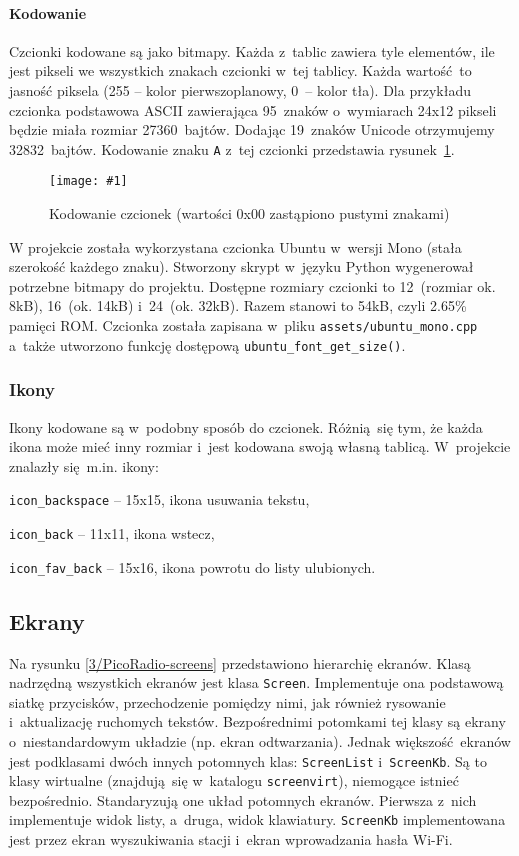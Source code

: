 \documentclass[polish]{aghengthesis}
\let\tempone\itemize
\let\temptwo\enditemize
\renewenvironment{itemize}{\tempone\setlength{\itemsep}{0cm}}{\temptwo}
\newcommand{\imgint}[4]{
	\begin{figure}[{#4}]
		\centering
		\texttt{[image: \#1]}
		\caption{#2}
		\label{#1}
	\end{figure}
}
\newcommand{\imgh}[3]{\imgint{#1}{#2}{#3}{H}}
\begin{document}
				\paragraph{Kodowanie}
					Czcionki kodowane są jako bitmapy. Każda z~tablic zawiera tyle elementów, ile jest pikseli we wszystkich znakach czcionki w~tej tablicy. Każda wartość to jasność piksela (255 -- kolor pierwszoplanowy, 0~-- kolor tła). Dla przykładu czcionka podstawowa ASCII zawierająca 95~znaków o~wymiarach 24x12 pikseli będzie miała rozmiar 27360~bajtów. Dodając 19~znaków Unicode otrzymujemy 32832~bajtów. Kodowanie znaku \lstinline|A| z~tej czcionki przedstawia rysunek~\ref{3/PicoRadio-screen-font}.
				
				\imgh{3/PicoRadio-screen-font}{Kodowanie czcionek (wartości 0x00 zastąpiono pustymi znakami)}{0.6}
				
				W projekcie została wykorzystana czcionka Ubuntu\textsuperscript{\cite{ubuntu_font}} w~wersji Mono (stała szerokość każdego znaku). Stworzony skrypt w~języku Python wygenerował potrzebne bitmapy do projektu. Dostępne rozmiary czcionki to 12~(rozmiar ok. 8kB), 16~(ok. 14kB) i~24~(ok. 32kB). Razem stanowi to 54kB, czyli 2.65\% pamięci ROM. Czcionka została zapisana w~pliku \lstinline|assets/ubuntu_mono.cpp| a~także utworzono funkcję dostępową \lstinline|ubuntu_font_get_size()|. 
				
			\subsubsection{Ikony}
				Ikony kodowane są w~podobny sposób do czcionek. Różnią się tym, że każda ikona może mieć inny rozmiar i~jest kodowana swoją własną tablicą. W~projekcie znalazły się m.in. ikony:
				\begin{itemize}
					\item \lstinline|icon_backspace| -- 15x15, ikona usuwania tekstu,
					\item \lstinline|icon_back| -- 11x11, ikona wstecz,
					\item \lstinline|icon_fav_back| -- 15x16, ikona powrotu do listy ulubionych.
				\end{itemize}
		
		\subsection{Ekrany}
			Na rysunku \ref{3/PicoRadio-screens} przedstawiono hierarchię ekranów. Klasą nadrzędną wszystkich ekranów jest klasa \lstinline|Screen|. Implementuje ona podstawową siatkę przycisków, przechodzenie pomiędzy nimi, jak również rysowanie i~aktualizację ruchomych tekstów. Bezpośrednimi potomkami tej klasy są ekrany o~niestandardowym układzie (np. ekran odtwarzania). Jednak większość ekranów jest podklasami dwóch innych potomnych klas: \lstinline|ScreenList| i~\lstinline|ScreenKb|. Są to klasy wirtualne (znajdują się w~katalogu \lstinline|screenvirt|), niemogące istnieć bezpośrednio. Standaryzują one układ potomnych ekranów. Pierwsza z~nich implementuje widok listy, a~druga, widok klawiatury. \lstinline|ScreenKb| implementowana jest przez ekran wyszukiwania stacji i~ekran wprowadzania hasła Wi-Fi.
			
\end{document}
